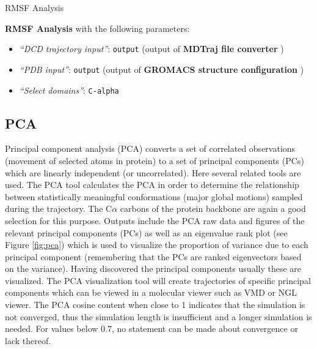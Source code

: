 \documentclass[twocolumn]{bmcart}%
\providecommand{\tightlist}{%
  \setlength{\itemsep}{0pt}\setlength{\parskip}{0pt}}
\begin{document}
\begin{handson_box_colour}{RMSF Analysis}



  \textbf{RMSF Analysis} with the following parameters:

  \begin{itemize}
  \tightlist
  \item
    \emph{``DCD trajectory input''}: \texttt{output} (output of
    \textbf{MDTraj file converter} )
  \item
    \emph{``PDB input''}: \texttt{output} (output of \textbf{GROMACS
    structure configuration} )
  \item
    \emph{``Select domains''}: \texttt{C-alpha}
  \end{itemize}



\end{handson_box_colour}


\hypertarget{pca-analysis}{%
\subsection*{PCA}\label{pca-analysis}}

Principal component analysis (PCA) converts a set of correlated
observations (movement of selected atoms in protein) to a set of principal
components (PCs) which are linearly independent (or uncorrelated). Here several related tools are used. 
The PCA tool calculates the PCA in order to determine the relationship between statistically meaningful conformations (major global motions) sampled during the trajectory. The C$\alpha$ carbons of the protein backbone are again a good selection for this purpose.  Outputs include the PCA raw data and figures of the relevant principal components (PCs) as well as an eigenvalue rank plot (see Figure \ref{fig:pca}) which is used to visualize the proportion of variance due to each principal component (remembering that the PCs are ranked eigenvectors based on the variance). 
Having discovered the principal components usually these are visualized. The PCA visualization tool will create trajectories of specific principal components which can be viewed in a molecular viewer such as VMD\cite{hump_vmd_1996} or NGL viewer\cite{Rose2018ngl}. The PCA cosine content when close to 1 indicates that the simulation is not converged, thus the simulation length is insufficient and a longer simulation is needed. For values below 0.7, no statement can be made about convergence or lack thereof. 
\end{document}
